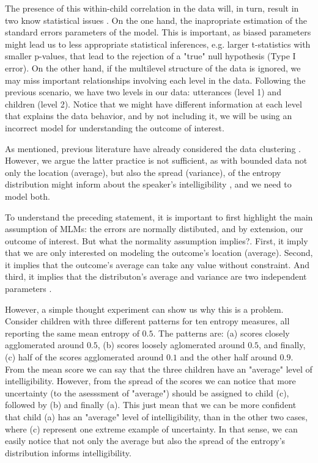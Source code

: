 The presence of this within-child correlation in the data will, in turn, result in two know statistical issues \citep{Finch_et_al_2019}. On the one hand, the inapropriate estimation of the standard errors parameters of the model. This is important, as biased parameters might lead us to less appropriate statistical inferences, e.g. larger t-statistics with smaller p-values, that lead to the rejection of a "true" null hypothesis (Type I error). On the other hand, if the multilevel structure of the data is ignored, we may miss important relationships involving each level in the data. Following the previous scenario, we have two levels in our data: utterances (level 1) and children (level 2). Notice that we might have different information at each level that explains the data behavior, and by not including it, we will be using an incorrect
model for understanding the outcome of interest.

As mentioned, previous literature have already considered the data clustering \cite{Boonen_et_al_2021}. However, we argue the latter practice is not sufficient, as with bounded data not only the location (average), but also the spread (variance), of the entropy distribution might inform about the speaker's intelligibility \citep{Nelder_et_al_1983}, and we need to model both.

To understand the preceding statement, it is important to first highlight the main assumption of MLMs: the errors are normally distibuted, and by extension, our outcome of interest. But what the normality assumption implies?. First, it imply that we are only interested on modeling the outcome's location (average). Second, it implies that the outcome's average can take any value without constraint. And third, it implies that the distributon's average and variance are two independent parameters \citep{Nelder_et_al_1983}.
 
However, a simple thought experiment can show us why this is a problem. Consider children with three different patterns for ten entropy measures, all reporting the same mean entropy of $0.5$. The patterns are: (a) scores closely agglomerated around $0.5$, (b) scores loosely aglomerated around $0.5$, and finally, (c) half of the scores agglomerated around $0.1$ and the other half around $0.9$. From the mean score we can say that the three children have an "average" level of intelligibility. However, from the spread of the scores we can notice that more uncertainty (to the asesssment of "average") should be assigned to child (c), followed by (b) and finally (a). This just mean that we can be more confident that child (a) has an "average" level of intelligibility, than in the other two cases, where (c) represent one extreme example of uncertainty. In that sense, we can easily notice that not only the average but also the spread of the entropy's distribution informs intelligibility.

